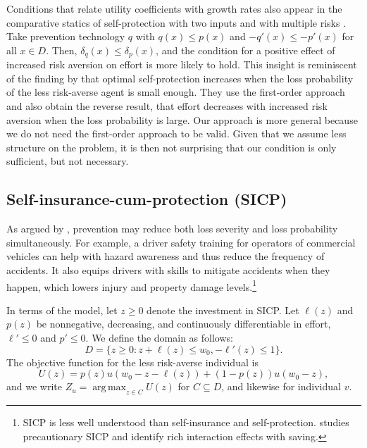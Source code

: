 \documentclass[11pt]{article}
\DeclareMathOperator*{\argmax}{arg\,max}
\begin{document}
Conditions that relate utility coefficients with growth rates also appear in the comparative statics of self-protection with two inputs \citep[see][]{hofmann2015multivariate} and with multiple risks \citep[see][]{courbage2017optimal}. Take prevention technology $q$ with $q(x) \leq p(x)$ and $-q'(x) \leq -p'(x)$ for all $x \in D$. Then, $\delta_q(x) \leq \delta_p(x)$, and the condition for a positive effect of increased risk aversion on effort is more likely to hold. This insight is reminiscent of the finding by \cite{jullien1999should} that optimal self-protection increases when the loss probability of the less risk-averse agent is small enough. They use the first-order approach and also obtain the reverse result, that effort decreases with increased risk aversion when the loss probability is large. Our approach is more general because we do not need the first-order approach to be valid. Given that we assume less structure on the problem, it is then not surprising that our condition is only sufficient, but not necessary.  

\subsection{Self-insurance-cum-protection (SICP)}

As argued by \cite{lee1998risk}, prevention may reduce both loss severity and loss probability simultaneously. For example, a driver safety training for operators of commercial vehicles can help with hazard awareness and thus reduce the frequency of accidents. It also equips drivers with skills to mitigate accidents when they happen, which lowers injury and property damage levels.\footnote{SICP is less well understood than self-insurance and self-protection. \cite{wong2016precautionary} studies precautionary SICP and \cite{peter2024precautionary} identify rich interaction effects with saving.} 

In terms of the model, let $z \geq 0$ denote the investment in SICP. Let $\ell(z)$ and $p(z)$ be nonnegative, decreasing, and continuously differentiable in effort, $\ell' \leq 0$ and $p' \leq 0$. We define the domain as follows:
	$$ D = \{ z \geq 0: z+\ell(z) \leq w_0, -\ell'(z) \leq 1\}. $$
The objective function for the less risk-averse individual is
	$$ U(z) = p(z) u(w_0-z-\ell(z)) + (1-p(z)) u(w_0-z), $$
and we write $Z_u = \argmax_{z \in C} U(z)$ for $C \subseteq D$, and likewise for individual $v$. 
\end{document}
